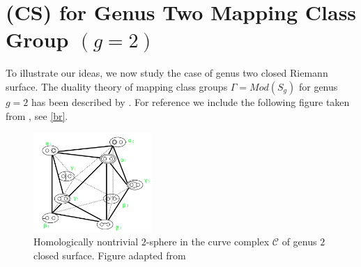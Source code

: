 \documentclass[12pt]{amsart}
\theoremstyle{definition}
\theoremstyle{remark}
\newcommand{\bZ}{\mathbb{Z}}
\newcommand{\sC}{\mathscr{C}}
\newcommand{\sT}{\mathscr{T}}
\begin{document}























\section{(CS) for Genus Two Mapping Class Group $(g=2)$}
To illustrate our ideas, we now study the case of genus two closed Riemann surface. The duality theory of mapping class groups $\Gamma=Mod(S_g)$ for genus $g=2$ has been described by \cite{Broaddus2012}. For reference we include the following figure taken from \cite[Fig.10]{Broaddus2012}, see \eqref{br}.%

\begin{figure}\label{br}
\centering
\includegraphics[width=0.4\textwidth]{broaddus-sphere-marked-new.png}
\caption{Homologically nontrivial $2$-sphere in the curve complex $\sC$ of genus $2$ closed surface. Figure adapted from \cite[Fig.10]{Broaddus2012}}
\end{figure}
\end{document}
